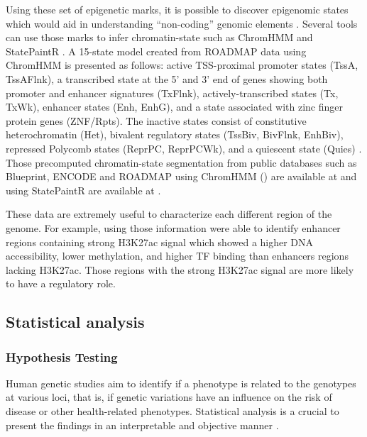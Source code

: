Using these set of epigenetic marks, it is possible to
 discover epigenomic states which would aid in understanding
 “non-coding” genomic elements \cite{statepaintr}.
 Several tools can use those marks to infer chromatin-state such as ChromHMM \cite{ernst2012chromhmm} and StatePaintR \cite{statepaintr}.
A 15-state model created from ROADMAP data using ChromHMM is presented as follows: active TSS-proximal promoter states (TssA, TssAFlnk), a transcribed state at the 5’ and 3’ end of genes showing both promoter and enhancer signatures (TxFlnk), actively-transcribed states (Tx, TxWk), enhancer states (Enh, EnhG), and a state associated with zinc finger protein genes (ZNF/Rpts). The inactive states consist of constitutive heterochromatin (Het), bivalent regulatory states (TssBiv, BivFlnk, EnhBiv), repressed Polycomb states (ReprPC, ReprPCWk), and a quiescent state (Quies) \cite{kundaje2015integrative}.
Those precomputed chromatin-state segmentation from
 public databases such as Blueprint, ENCODE and ROADMAP using ChromHMM ()
 are available at  and
 using StatePaintR  are available at .

These data are extremely useful to characterize each different region of the genome.
For example, using those information  were able to identify enhancer regions
containing strong H3K27ac signal which showed a higher DNA accessibility,
lower methylation, and higher TF binding than enhancers regions lacking H3K27ac.
Those regions with the strong H3K27ac signal are more likely to have a regulatory role.

\subsection{Statistical analysis}

\subsubsection{Hypothesis Testing}

Human genetic studies aim to identify if a phenotype is related to the genotypes
at various loci, that is, if genetic variations have an influence on the risk of
disease or other health-related phenotypes.
Statistical analysis is a crucial to present the findings in an
interpretable and objective manner \cite{sham2014statistical}.

